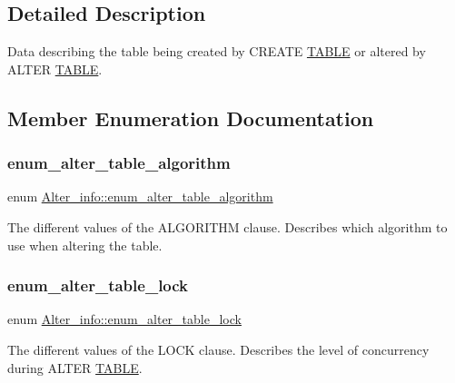 \subsection{Detailed Description}
Data describing the table being created by C\+R\+E\+A\+TE \mbox{\hyperlink{structTABLE}{T\+A\+B\+LE}} or altered by A\+L\+T\+ER \mbox{\hyperlink{structTABLE}{T\+A\+B\+LE}}. 

\subsection{Member Enumeration Documentation}
\mbox{\label{classAlter__info_a01de1481ff05e3f4fc1efb2f63c2274c}} 
\subsubsection{\texorpdfstring{enum\+\_\+alter\+\_\+table\+\_\+algorithm}{enum\_alter\_table\_algorithm}}
{\footnotesize\ttfamily enum \mbox{\hyperlink{classAlter__info_a01de1481ff05e3f4fc1efb2f63c2274c}{Alter\+\_\+info\+::enum\+\_\+alter\+\_\+table\+\_\+algorithm}}}

The different values of the A\+L\+G\+O\+R\+I\+T\+HM clause. Describes which algorithm to use when altering the table. \mbox{\label{classAlter__info_a10a92184da9b9d35060e9014fd4e0946}} 
\subsubsection{\texorpdfstring{enum\+\_\+alter\+\_\+table\+\_\+lock}{enum\_alter\_table\_lock}}
{\footnotesize\ttfamily enum \mbox{\hyperlink{classAlter__info_a10a92184da9b9d35060e9014fd4e0946}{Alter\+\_\+info\+::enum\+\_\+alter\+\_\+table\+\_\+lock}}}

The different values of the L\+O\+CK clause. Describes the level of concurrency during A\+L\+T\+ER \mbox{\hyperlink{structTABLE}{T\+A\+B\+LE}}. \mbox{\label{classAlter__info_a4779e4302f27cfae682bf2e5a2e891a5}} 
